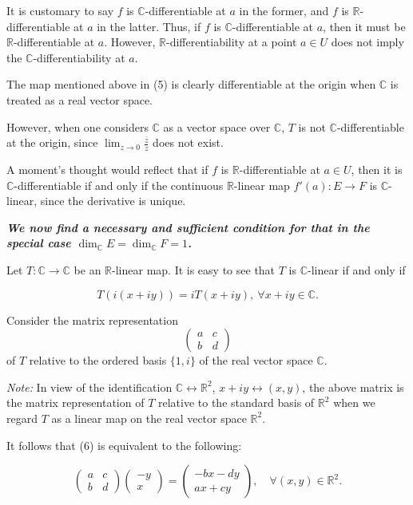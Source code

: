 \documentclass{book}
\begin{document}
It is customary to say $f$ is $\mathbb{C}$-differentiable at $a$ in the former, and $f$ is $\mathbb{R}$-differentiable at $a$ in the latter. Thus, if $f$ is $\mathbb{C}$-differentiable at $a$, then it must be $\mathbb{R}$-differentiable at $a$. However, $\mathbb{R}$-differentiability at a point $a \in U$ does not imply the $\mathbb{C}$-differentiability at $a$. 

The map mentioned above in (5) is clearly differentiable at the origin when $\mathbb{C}$ is treated as a real vector space. 

However, when one considers $\mathbb{C}$ as a vector space over $\mathbb{C}$, $T$ is not $\mathbb{C}$-differentiable at the origin, since $\lim_{z \to 0} \frac{\overline{z}}{z}$ does not exist. 

A moment’s thought would reflect that if $f$ is $\mathbb{R}$-differentiable at $a \in U$, then it is $\mathbb{C}$-differentiable if and only if the continuous $\mathbb{R}$-linear map $f'(a) : E \to F$ is $\mathbb{C}$-linear, since the derivative is unique. 

\textbf{\textit{We now find a necessary and sufficient condition for that in the special case $\dim_{\mathbb{C}} E = \dim_{\mathbb{C}} F = 1$.}}

Let $T : \mathbb{C} \to \mathbb{C}$ be an $\mathbb{R}$-linear map. It is easy to see that $T$ is $\mathbb{C}$-linear if and only if

\[
T(i(x + iy)) = iT(x + iy), \ \forall x + iy \in \mathbb{C}.
\tag{6}
\]

Consider the matrix representation
\[
\begin{pmatrix}
a & c \\
b & d
\end{pmatrix}
\]
of $T$ relative to the ordered basis $\{1, i\}$ of the real vector space $\mathbb{C}$.

\textit{Note:} In view of the identification $\mathbb{C} \leftrightarrow \mathbb{R}^2$, $x + iy \leftrightarrow (x, y)$, the above matrix is the matrix representation of $T$ relative to the standard basis of $\mathbb{R}^2$ when we regard $T$ as a linear map on the real vector space $\mathbb{R}^2$.

It follows that (6) is equivalent to the following:

\[
\begin{pmatrix}
a & c \\
b & d
\end{pmatrix}
\begin{pmatrix}
-y \\
x
\end{pmatrix}
=
\begin{pmatrix}
-bx - dy \\
ax + cy
\end{pmatrix},
\quad \forall (x, y) \in \mathbb{R}^2.
\tag{7}
\]
\end{document}
